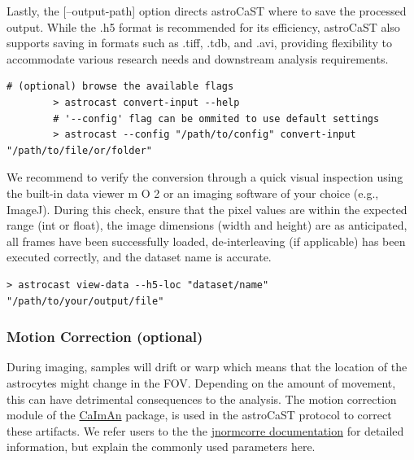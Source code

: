 \documentclass[utf8]{FrontiersinHarvard}
\newcommand{\inlineBash}[1]{%
    \begingroup
    \edef\temp{#1}%
    \expandafter\StrSubstitute\expandafter{\temp}{--}{-{-}}[\temp]%
    \tcbox[on line, boxsep=0pt, left=1pt, right=1pt, top=1pt, bottom=1pt,
        boxrule=0pt, arc=0pt, outer arc=0pt, colback=lightgray]{
        \texttt{\small \temp}
    }%
    \endgroup
}
\newcommand{\inlinepy}[1]{\inlineBash{#1}}
\newcommand{\fref}{ m O{} }{ (Figure~\ref{fig:#1}\IfValueT{#2}{\,#2})}
\begin{document}
    Lastly, the \inlinepy{--output-path} option directs astroCaST where to save the processed output. While the .h5 format is recommended for its efficiency, astroCaST also supports saving in formats such as .tiff, .tdb, and .avi, providing flexibility to accommodate various research needs and downstream analysis requirements.

    \begin{lstlisting}[style=bashStyle]
        # (optional) browse the available flags
        > astrocast convert-input --help
        # '--config' flag can be ommited to use default settings
        > astrocast --config "/path/to/config" convert-input "/path/to/file/or/folder"
    \end{lstlisting}

    We recommend to verify the conversion through a quick visual inspection using the built-in data viewer\fref{2} or an imaging software of your choice (e.g., ImageJ). During this check, ensure that the pixel values are within the expected range (int or float), the image dimensions (width and height) are as anticipated, all frames have been successfully loaded, de-interleaving (if applicable) has been executed correctly, and the dataset name is accurate.

    \begin{lstlisting}[style=bashStyle]
        > astrocast view-data --h5-loc "dataset/name" "/path/to/your/output/file"
    \end{lstlisting}

    \subsubsection{Motion Correction (optional)}

    During imaging, samples will drift or warp which means that the location of the astrocytes might change in the \ac{FOV}. Depending on the amount of movement, this can have detrimental consequences to the analysis. The motion correction module of the \href{https://github.com/flatironinstitute/CaImAn}{CaImAn} package\citep{giovannucci_caiman_2019}, is used in the astroCaST protocol to correct these artifacts. We refer users to the the \href{https://jnormcorre.readthedocs.io/en/latest/Algo.html#motion-correction-methods}{jnormcorre documentation} for detailed information, but explain the commonly used parameters here.
\end{document}
